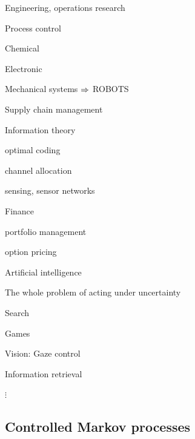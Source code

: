 {
\bi
\item Engineering, operations research
\bi 
\item Process control
\bi
\item Chemical
\item Electronic
\item Mechanical systems $\Rightarrow$ ROBOTS
\ei
\item Supply chain management
\ei
\item Information theory 
\bi
\item optimal coding
\item channel allocation
\item sensing, sensor networks
\ei
\item Finance
\bi
\item portfolio management
\item option pricing
\ei
\item Artificial intelligence
\bi
\item The whole problem of acting under uncertainty
\item Search
\item Games
\item Vision: Gaze control
\item Information retrieval
\ei
\item $\vdots$
\ei
{}
}

\subsection{Controlled Markov processes}

